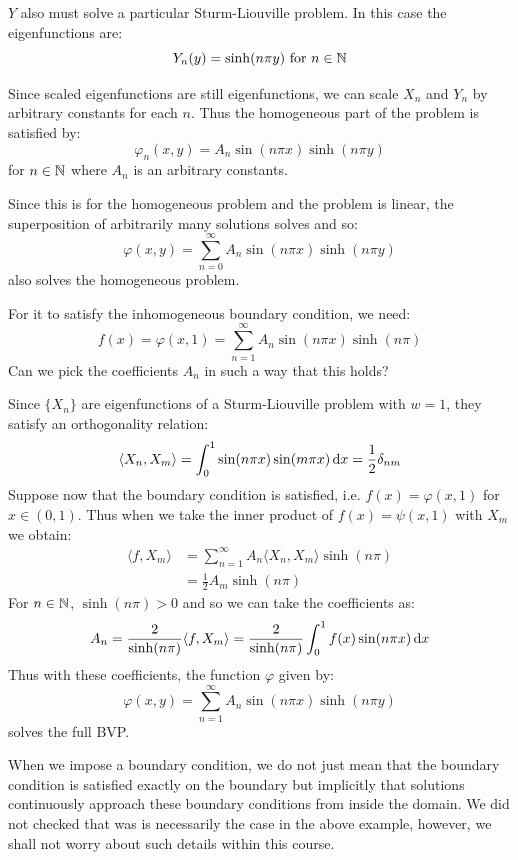 \documentclass[../main.tex]{subfiles}
\begin{document}
$Y$ also must solve a particular Sturm-Liouville problem.
In this case the eigenfunctions are:
\[
  Y_n(y) = \sinh (n \pi y) \text{ for } n \in \mathbb{N}
\]

Since scaled eigenfunctions are still eigenfunctions, we can scale $X_n$ and $Y_n$ by arbitrary constants for each $n$.
Thus the homogeneous part of the problem is satisfied by:
\[
  \varphi_n(x, y) = A_n \sin(n \pi x)\sinh(n \pi y)
\]
for $n \in \mathbb{N}$ where $A_n$ is an arbitrary constants.

Since this is for the homogeneous problem and the problem is linear, the superposition of arbitrarily many solutions solves and so:
\[
  \varphi(x, y) = \sum_{n = 0}^{\infty} A_n \sin(n \pi x)\sinh(n \pi y)
\]
also solves the homogeneous problem.

For it to satisfy the inhomogeneous boundary condition, we need:
\[
  f(x) = \varphi(x, 1) = \sum_{n = 1}^{\infty} A_n \sin(n \pi x) \sinh(n \pi)
\]
Can we pick the coefficients $A_n$ in such a way that this holds?

Since $\{X_n\}$ are eigenfunctions of a Sturm-Liouville problem with $w = 1$, they satisfy an orthogonality relation:
\[
  \langle X_n, X_m \rangle = \int_{0}^{1} \sin(n \pi x) \sin(m \pi x) \d{x} = \frac{1}{2} \delta_{n m}
\]
Suppose now that the boundary condition is satisfied, i.e. $f(x) = \varphi(x, 1)$ for $x \in (0, 1)$.
Thus when we take the inner product of $f(x) = \psi(x, 1)$ with $X_m$ we obtain:
\begin{align*}
  \langle f, X_m \rangle &= \sum_{n = 1}^{\infty} A_n \langle X_n, X_m \rangle \sinh(n \pi) \\
                         &= \frac{1}{2} A_m \sinh(n \pi)
\end{align*}
For $n \in \mathbb{N}$, $\sinh(n\pi) > 0$ and so we can take the coefficients as:
\[
  A_n = \frac{2}{\sinh(n \pi)} \langle f,X_m \rangle = \frac{2}{\sinh(n \pi)} \int_{0}^{1} f(x) \sin(n \pi x) \d{x}
\]
Thus with these coefficients, the function $\varphi$ given by:
\[
  \varphi(x, y) = \sum_{n = 1}^{\infty} A_n \sin(n \pi x)\sinh(n \pi y)
\]
solves the full BVP.
\begin{remark}
  When we impose a boundary condition, we do not just mean that the boundary condition is satisfied exactly on the boundary but implicitly that solutions continuously approach these boundary conditions from inside the domain.
  We did not checked that was is necessarily the case in the above example, however, we shall not worry about such details within this course.
\end{remark}
\end{document}
